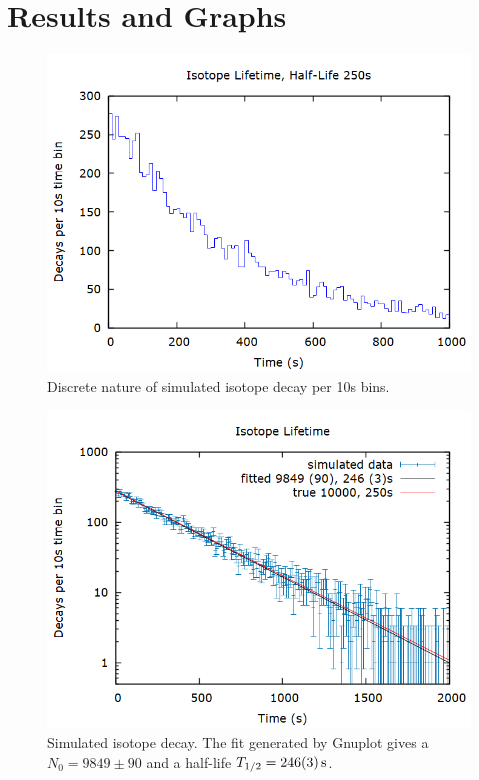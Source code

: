 \documentclass[aps,prl,twocolumn,superscriptaddress]{revtex4-1}
\begin{document}
\section{Results and Graphs}

\begin{figure}[htbp]
  	\begin{center}
 		\includegraphics[scale=0.3]{step.png}
  		\caption{Discrete nature of simulated isotope decay per 10s bins.}
  		\label{gr:step}
 	\end{center}
\end{figure}

\begin{figure}[htbp]
  	\begin{center}
 		\includegraphics[scale=0.3]{iso.png}
  		\caption{Simulated isotope decay. The fit generated by Gnuplot gives a $N_0 = 9849 \pm 90$ and a half-life $T_{1/2} = \SI{246 \pm 3}{\s}$.}
  		\label{gr:iso}
 	\end{center}
\end{figure}
\end{document}

